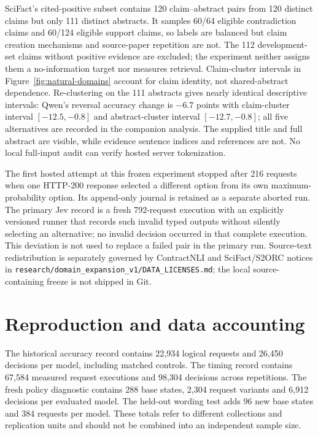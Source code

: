 SciFact's cited-positive subset contains 120 claim--abstract pairs from 120 distinct claims but only 111 distinct abstracts. It samples 60/64 eligible contradiction claims and 60/124 eligible support claims, so labels are balanced but claim creation mechanisms and source-paper repetition are not. The 112 development-set claims without positive evidence are excluded; the experiment neither assigns them a no-information target nor measures retrieval. Claim-cluster intervals in Figure~\ref{fig:natural-domains} account for claim identity, not shared-abstract dependence. Re-clustering on the 111 abstracts gives nearly identical descriptive intervals: Qwen's reversal accuracy change is $-6.7$ points with claim-cluster interval $[-12.5,-0.8]$ and abstract-cluster interval $[-12.7,-0.8]$; all five alternatives are recorded in the companion analysis. The supplied title and full abstract are visible, while evidence sentence indices and references are not. No local full-input audit can verify hosted server tokenization.

The first hosted attempt at this frozen experiment stopped after 216 requests when one HTTP-200 response selected a different option from its own maximum-probability option. Its append-only journal is retained as a separate aborted run. The primary Jev record is a fresh 792-request execution with an explicitly versioned runner that records such invalid typed outputs without silently selecting an alternative; no invalid decision occurred in that complete execution. This deviation is not used to replace a failed pair in the primary run. Source-text redistribution is separately governed by ContractNLI and SciFact/S2ORC notices in \texttt{research/domain\_expansion\_v1/DATA\_LICENSES.md}; the local source-containing freeze is not shipped in Git.




\section{Reproduction and data accounting}
The historical accuracy record contains 22,934 logical requests and 26,450 decisions per model, including matched controls. The timing record contains 67,584 measured request executions and 98,304 decisions across repetitions. The fresh policy diagnostic contains 288 base states, 2,304 request variants and 6,912 decisions per evaluated model. The held-out wording test adds 96 new base states and 384 requests per model. These totals refer to different collections and replication units and should not be combined into an independent sample size.

